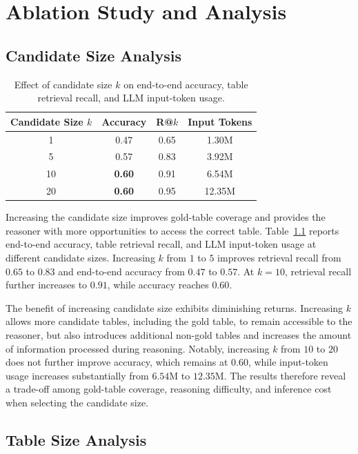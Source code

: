 \chapter{Ablation Study and Analysis}
\label{sec:analysis}
\section{Candidate Size Analysis}

\begin{table}[t]
\centering
\small
\begin{tabular}{cccc}
\hline
\textbf{Candidate Size $k$} &
\textbf{Accuracy} &
\textbf{R@$k$} &
\textbf{Input Tokens} \\
\hline
1  & 0.47 & 0.65 & 1.30M \\
5  & 0.57 & 0.83 & 3.92M \\
10 & \textbf{0.60} & 0.91 & 6.54M \\
20 & \textbf{0.60} & 0.95 & 12.35M \\
\hline
\end{tabular}
\caption{Effect of candidate size $k$ on end-to-end accuracy, table retrieval recall, and LLM input-token usage.}
\label{tab:k_ablation}
\end{table}

Increasing the candidate size improves gold-table coverage and provides the reasoner with more opportunities to access the correct table.
Table~\ref{tab:k_ablation} reports end-to-end accuracy, table retrieval recall, and LLM input-token usage at different candidate sizes.
Increasing $k$ from $1$ to $5$ improves retrieval recall from $0.65$ to $0.83$ and end-to-end accuracy from $0.47$ to $0.57$.
At $k=10$, retrieval recall further increases to $0.91$, while accuracy reaches $0.60$.

The benefit of increasing candidate size exhibits diminishing returns.
Increasing $k$ allows more candidate tables, including the gold table, to remain accessible to the reasoner, but also introduces additional non-gold tables and increases the amount of information processed during reasoning.
Notably, increasing $k$ from $10$ to $20$ does not further improve accuracy, which remains at $0.60$, while input-token usage increases substantially from $6.54$M to $12.35$M.
The results therefore reveal a trade-off among gold-table coverage, reasoning difficulty, and inference cost when selecting the candidate size.

\section{Table Size Analysis}

